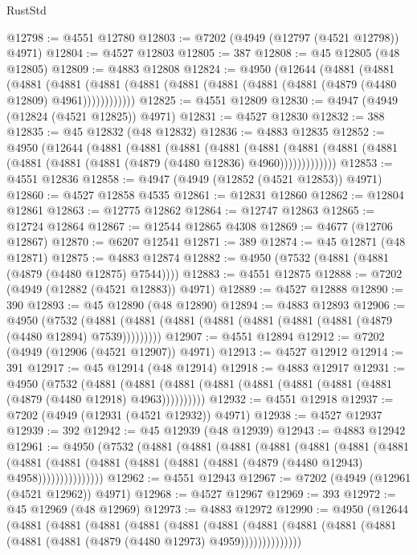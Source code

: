 \begin{lexlean}{RustStd}
\begin{coremodule}
@12798 := @4551 @12780
@12803 := @7202 (@4949 (@12797 (@4521 @12798)) @4971)
@12804 := @4527 @12803
@12805 := 387
@12808 := @45 @12805 (@48 @12805)
@12809 := @4883 @12808
@12824 := @4950
    (@12644
      (@4881
        (@4881
          (@4881
            (@4881 (@4881 (@4881 (@4881 (@4881 (@4881 (@4881 (@4879 (@4480 @12809) @4961))))))))))))
@12825 := @4551 @12809
@12830 := @4947 (@4949 (@12824 (@4521 @12825)) @4971)
@12831 := @4527 @12830
@12832 := 388
@12835 := @45 @12832 (@48 @12832)
@12836 := @4883 @12835
@12852 := @4950
    (@12644
      (@4881
        (@4881
          (@4881
            (@4881
              (@4881
                (@4881 (@4881 (@4881 (@4881 (@4881 (@4881 (@4879 (@4480 @12836) @4960)))))))))))))
@12853 := @4551 @12836
@12858 := @4947 (@4949 (@12852 (@4521 @12853)) @4971)
@12860 := @4527 @12858 @4535
@12861 := @12831 @12860
@12862 := @12804 @12861
@12863 := @12775 @12862
@12864 := @12747 @12863
@12865 := @12724 @12864
@12867 := @12544 @12865 @4308
@12869 := @4677 (@12706 @12867)
@12870 := @6207 @12541
@12871 := 389
@12874 := @45 @12871 (@48 @12871)
@12875 := @4883 @12874
@12882 := @4950 (@7532 (@4881 (@4881 (@4879 (@4480 @12875) @7544))))
@12883 := @4551 @12875
@12888 := @7202 (@4949 (@12882 (@4521 @12883)) @4971)
@12889 := @4527 @12888
@12890 := 390
@12893 := @45 @12890 (@48 @12890)
@12894 := @4883 @12893
@12906 := @4950
    (@7532 (@4881 (@4881 (@4881 (@4881 (@4881 (@4881 (@4881 (@4879 (@4480 @12894) @7539)))))))))
@12907 := @4551 @12894
@12912 := @7202 (@4949 (@12906 (@4521 @12907)) @4971)
@12913 := @4527 @12912
@12914 := 391
@12917 := @45 @12914 (@48 @12914)
@12918 := @4883 @12917
@12931 := @4950
    (@7532
      (@4881 (@4881 (@4881 (@4881 (@4881 (@4881 (@4881 (@4881 (@4879 (@4480 @12918) @4963))))))))))
@12932 := @4551 @12918
@12937 := @7202 (@4949 (@12931 (@4521 @12932)) @4971)
@12938 := @4527 @12937
@12939 := 392
@12942 := @45 @12939 (@48 @12939)
@12943 := @4883 @12942
@12961 := @4950
    (@7532
      (@4881
        (@4881
          (@4881
            (@4881
              (@4881
                (@4881
                  (@4881
                    (@4881
                      (@4881 (@4881 (@4881 (@4881 (@4881 (@4879 (@4480 @12943) @4958)))))))))))))))
@12962 := @4551 @12943
@12967 := @7202 (@4949 (@12961 (@4521 @12962)) @4971)
@12968 := @4527 @12967
@12969 := 393
@12972 := @45 @12969 (@48 @12969)
@12973 := @4883 @12972
@12990 := @4950
    (@12644
      (@4881
        (@4881
          (@4881
            (@4881
              (@4881
                (@4881
                  (@4881
                    (@4881 (@4881 (@4881 (@4881 (@4881 (@4879 (@4480 @12973) @4959))))))))))))))

\end{coremodule}
\end{lexlean}
